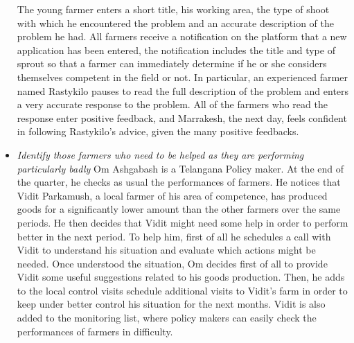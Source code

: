 \documentclass[10pt]{article}
\begin{document}
\begin{itemize}
      The young farmer enters a short title, his working area, the type of shoot with which he encountered the problem and an accurate description 
      of the problem he had. All farmers receive a notification on the platform that a new application has been entered, the notification includes 
      the title and type of sprout so that a farmer can immediately determine if he or she considers themselves competent in the field or not. 
      In particular, an experienced farmer named Rastykilo pauses to read the full description of the problem and enters a very accurate 
      response to the problem. All of the farmers who read the response enter positive feedback, and Marrakesh, the next day, feels confident 
      in following Rastykilo's advice, given the many positive feedbacks.
      \item \textit{Identify those farmers who need to be helped as they are performing particularly badly}
      Om Ashgabash is a Telangana Policy maker. At the end of the quarter, he checks as usual the performances of farmers. He notices that Vidit Parkamush, a local
      farmer of his area of competence, has produced goods for a significantly lower amount than the other farmers over the same periods. He then decides that Vidit might
      need some help in order to perform better in the next period. To help him, first of all he schedules a call with Vidit to understand his situation and evaluate which
      actions might be needed. Once understood the situation, Om decides first of all to provide Vidit some useful suggestions related to his goods production. Then, he adds
      to the local control visits schedule additional visits to Vidit's farm in order to keep under better control his situation for the next months. Vidit is also added to the
      monitoring list, where policy makers can easily check the performances of farmers in difficulty.
\end{itemize}
\end{document}

